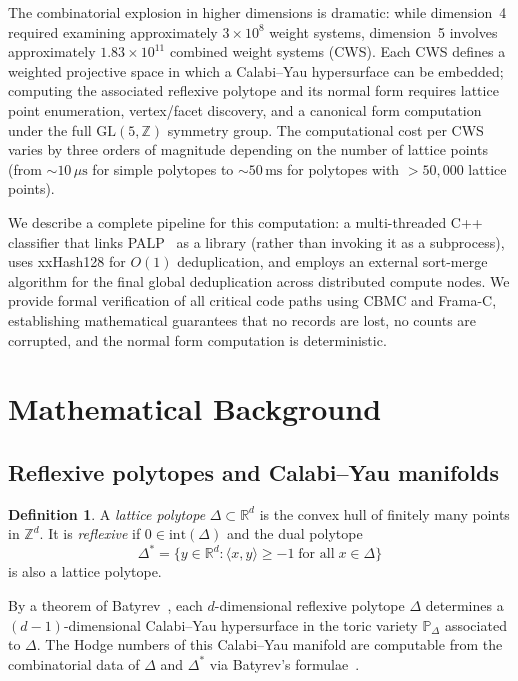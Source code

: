 \documentclass[12pt,a4paper]{article}
\theoremstyle{definition}
\newtheorem{definition}[theorem]{Definition}
\newcommand{\ZZ}{\mathbb{Z}}
\newcommand{\RR}{\mathbb{R}}
\newcommand{\GL}{\mathrm{GL}}
\begin{document}
The combinatorial explosion in higher dimensions is dramatic: while
dimension~4 required examining approximately $3 \times 10^8$ weight
systems, dimension~5 involves approximately $1.83 \times 10^{11}$
combined weight systems (CWS).  Each CWS defines a weighted projective
space in which a Calabi--Yau hypersurface can be embedded; computing the
associated reflexive polytope and its normal form requires lattice point
enumeration, vertex/facet discovery, and a canonical form computation
under the full $\GL(5,\ZZ)$ symmetry group.  The computational cost per
CWS varies by three orders of magnitude depending on the number of
lattice points (from $\sim 10\,\mu\text{s}$ for simple polytopes to
$\sim 50\,\text{ms}$ for polytopes with $> 50{,}000$ lattice points).

We describe a complete pipeline for this computation: a multi-threaded
C++ classifier that links PALP~\cite{PALP} as a library (rather than
invoking it as a subprocess), uses xxHash128 for $O(1)$ deduplication,
and employs an external sort-merge algorithm for the final global
deduplication across distributed compute nodes.  We provide formal
verification of all critical code paths using CBMC and Frama-C,
establishing mathematical guarantees that no records are lost, no counts
are corrupted, and the normal form computation is deterministic.

\section{Mathematical Background}
\label{sec:math}

\subsection{Reflexive polytopes and Calabi--Yau manifolds}

\begin{definition}
A \emph{lattice polytope} $\Delta \subset \RR^d$ is the convex hull of
finitely many points in $\ZZ^d$.  It is \emph{reflexive} if
$0 \in \mathrm{int}(\Delta)$ and the dual polytope
\[
  \Delta^* = \{ y \in \RR^d : \langle x, y \rangle \geq -1
               \;\text{for all}\; x \in \Delta \}
\]
is also a lattice polytope.
\end{definition}

By a theorem of Batyrev~\cite{Batyrev1994}, each $d$-dimensional reflexive
polytope $\Delta$ determines a $(d-1)$-dimensional Calabi--Yau
hypersurface in the toric variety $\mathbb{P}_\Delta$ associated to
$\Delta$.  The Hodge numbers of this Calabi--Yau manifold are
computable from the combinatorial data of $\Delta$ and $\Delta^*$
via Batyrev's formulae~\cite{BatyrevBorisov1996}.
\end{document}
